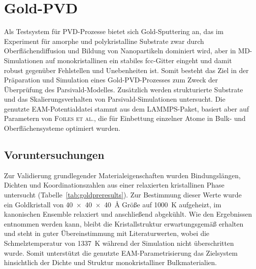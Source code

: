 \section{Gold-PVD}
\label{goldpvd}


Als Testsystem für PVD-Prozesse bietet sich Gold-Sputtering an, das im Experiment für amorphe und polykristalline Substrate zwar durch Oberflächendiffusion und Bildung von Nanopartikeln dominiert wird\cite{svorcik_annealing_2011}, aber in MD-Simulationen auf monokristallinen ein stabiles fcc-Gitter eingeht und damit robust gegenüber Fehlstellen und Unebenheiten ist.
Somit besteht das Ziel in der Präparation und Simulation eines Gold-PVD-Prozesses zum Zweck der Überprüfung des Parsivald-Modelles.
Zusätzlich werden strukturierte Substrate und das Skalierungsverhalten von Parsivald-Simulationen untersucht.
Die genutzte EAM-Potentialdatei stammt aus dem LAMMPS-Paket\cite{plimpton_lammps_2014}, basiert aber auf Parametern von \textsc{Foiles et al.}\cite{foiles_embedded-atom-method_1986}, die für Einbettung einzelner Atome in Bulk- und Oberflächensysteme optimiert wurden.

\subsection{Voruntersuchungen}

Zur Validierung grundlegender Materialeigenschaften wurden Bindungslängen, Dichten und Koordinationszahlen aus einer relaxierten kristallinen Phase untersucht (Tabelle~\ref{tab:goldpreresults}).
Zur Bestimmung dieser Werte wurde ein Goldkristall von \SI{40x40x40}{\angstrom} Größe auf \SI{1000}{\kelvin} aufgeheizt, im kanonischen Ensemble relaxiert und anschließend abgekühlt.
Wie den Ergebnissen entnommen werden kann, bleibt die Kristallstruktur erwartungsgemäß erhalten und steht in guter Übereinstimmung mit Literaturwerten, wobei die Schmelztemperatur von \SI{1337}{\kelvin} während der Simulation nicht überschritten wurde.
Somit unterstützt die genutzte EAM-Parametrisierung das Zielsystem hinsichtlich der Dichte und Struktur monokristalliner Bulkmaterialien.

